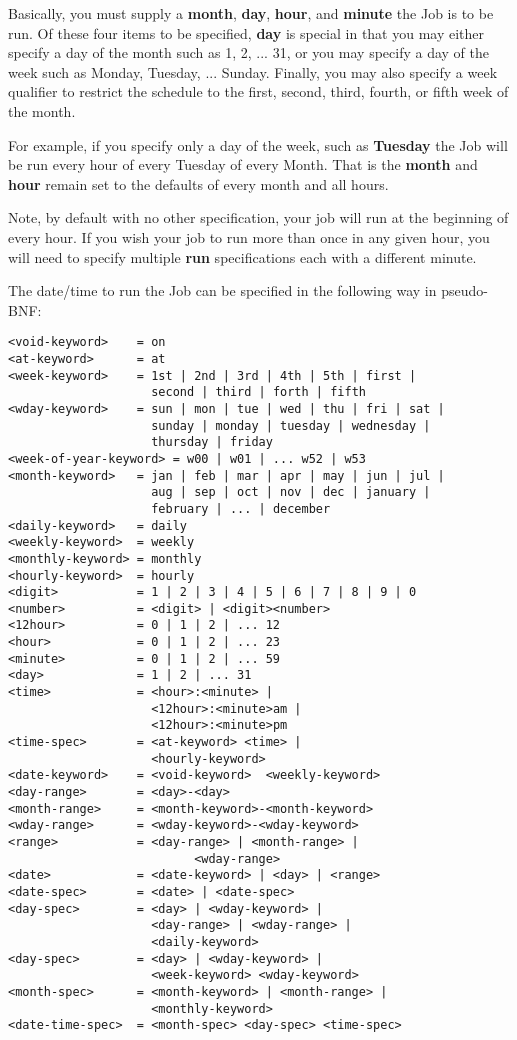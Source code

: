 \begin{description}
Basically, you must supply a {\bf month}, {\bf day}, {\bf hour}, and  {\bf
minute} the Job is to be run. Of these four items to be specified,  {\bf day}
is special in that you may either specify a day of the month  such as 1, 2,
... 31, or you may specify a day of the week such  as Monday, Tuesday, ...
Sunday. Finally, you may also specify a  week qualifier to restrict the
schedule to the first, second, third,  fourth, or fifth week of the month.  

For example, if you specify only a day of the week, such as {\bf Tuesday}  the
Job will be run every hour of every Tuesday of every Month. That  is the {\bf
month} and {\bf hour} remain set to the defaults of  every month and all
hours.  

Note, by default with no other specification, your job will run  at the
beginning of every hour. If you wish your job to run more than  once in any
given hour, you will need to specify multiple {\bf run}  specifications each
with a different minute.  

The date/time to run the Job can be specified in the following way  in
pseudo-BNF:  

\footnotesize
\begin{verbatim}
<void-keyword>    = on
<at-keyword>      = at
<week-keyword>    = 1st | 2nd | 3rd | 4th | 5th | first |
                    second | third | forth | fifth
<wday-keyword>    = sun | mon | tue | wed | thu | fri | sat |
                    sunday | monday | tuesday | wednesday |
                    thursday | friday
<week-of-year-keyword> = w00 | w01 | ... w52 | w53
<month-keyword>   = jan | feb | mar | apr | may | jun | jul |
                    aug | sep | oct | nov | dec | january |
                    february | ... | december
<daily-keyword>   = daily
<weekly-keyword>  = weekly
<monthly-keyword> = monthly
<hourly-keyword>  = hourly
<digit>           = 1 | 2 | 3 | 4 | 5 | 6 | 7 | 8 | 9 | 0
<number>          = <digit> | <digit><number>
<12hour>          = 0 | 1 | 2 | ... 12
<hour>            = 0 | 1 | 2 | ... 23
<minute>          = 0 | 1 | 2 | ... 59
<day>             = 1 | 2 | ... 31
<time>            = <hour>:<minute> |
                    <12hour>:<minute>am |
                    <12hour>:<minute>pm
<time-spec>       = <at-keyword> <time> |
                    <hourly-keyword>
<date-keyword>    = <void-keyword>  <weekly-keyword>
<day-range>       = <day>-<day>
<month-range>     = <month-keyword>-<month-keyword>
<wday-range>      = <wday-keyword>-<wday-keyword>
<range>           = <day-range> | <month-range> |
                          <wday-range>
<date>            = <date-keyword> | <day> | <range>
<date-spec>       = <date> | <date-spec>
<day-spec>        = <day> | <wday-keyword> |
                    <day-range> | <wday-range> |
                    <daily-keyword>
<day-spec>        = <day> | <wday-keyword> |
                    <week-keyword> <wday-keyword>
<month-spec>      = <month-keyword> | <month-range> |
                    <monthly-keyword>
<date-time-spec>  = <month-spec> <day-spec> <time-spec>
\end{verbatim}
\normalsize

\end{description}

